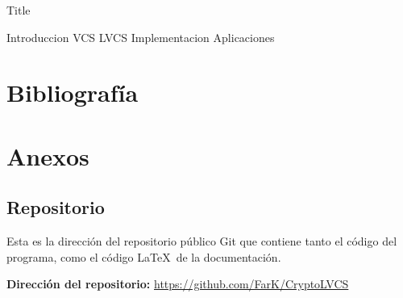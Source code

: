 \documentclass[a4paper,12pt]{article}
\begin{document}
{Title}

\tableofcontents
\newpage

{Introduccion}
\newpage
{VCS}
\newpage
{LVCS}
\newpage
{Implementacion}
\newpage
{Aplicaciones}
\newpage

\section{Bibliografía}
\nocite{*}



\newpage
\section{Anexos}
\subsection{Repositorio}
Esta es la dirección del repositorio público Git que contiene tanto el código
del programa, como el código \LaTeX\ de la documentación.

\textbf{Dirección del repositorio:} \url{https://github.com/FarK/CryptoLVCS}
\end{document}
